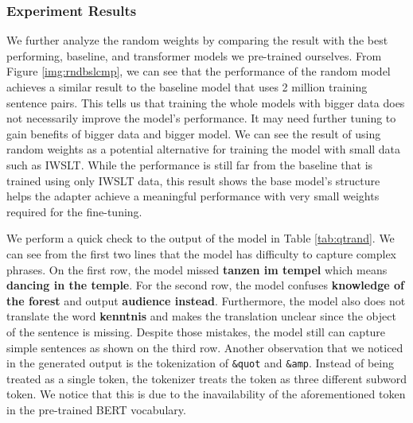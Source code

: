 \subsubsection{Experiment Results}
We further analyze the random weights by comparing the result with the best performing, baseline, and transformer models we pre-trained ourselves. From Figure \ref{img:rndbslcmp}, we can see that the performance of the random model achieves a similar result to the baseline model that uses 2 million training sentence pairs.
This tells us that training the whole models with bigger data does not necessarily improve the model's performance. It may need further tuning to gain benefits of bigger data and bigger model. We can see the result of using random weights as a potential alternative for training the model with small data such as IWSLT.
While the performance is still far from the baseline that is trained using only IWSLT data, this result shows the base model's structure helps the adapter achieve a meaningful performance with very small weights required for the fine-tuning.

We perform a quick check to the output of the model in Table \ref{tab:qtrand}. We can see from the first two lines that the model has difficulty to capture complex phrases. On the first row, the model missed \textbf{tanzen im tempel} which means \textbf{dancing in the temple}. For the second row, the model confuses \textbf{knowledge of the forest} and output \textbf{audience instead}. Furthermore, the model also does not translate the word \textbf{kenntnis} and makes the translation unclear since the object of the sentence is missing. Despite those mistakes, the model still can capture simple sentences as shown on the third row. Another observation that we noticed in the generated output is the tokenization of \texttt{\&quot\;} and \texttt{\&amp\;}. Instead of being treated as a single token, the tokenizer treats the token as three different subword token. We notice that this is due to the inavailability of the aforementioned token in the pre-trained BERT vocabulary.


